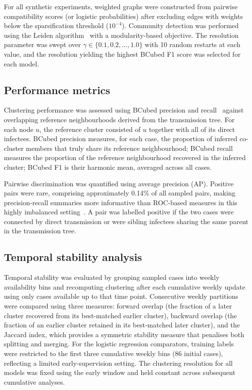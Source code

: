 \documentclass[10pt,letterpaper]{article}
\begin{document}
For all synthetic experiments, weighted graphs were constructed from pairwise compatibility scores (or logistic probabilities) after excluding edges with weights below the sparsification threshold ($10^{-4}$). Community detection was performed using the Leiden algorithm~\cite{Traag2019} with a modularity-based objective. The resolution parameter was swept over $\gamma \in \{0.1, 0.2, \ldots, 1.0\}$ with 10 random restarts at each value, and the resolution yielding the highest BCubed F1 score was selected for each model.

\subsection*{Performance metrics}

Clustering performance was assessed using BCubed precision and recall~\cite{Amigo2008} against overlapping reference neighbourhoods derived from the transmission tree. For each node $u$, the reference cluster consisted of $u$ together with all of its direct infectees. BCubed precision measures, for each case, the proportion of inferred co-cluster members that truly share its reference neighbourhood; BCubed recall measures the proportion of the reference neighbourhood recovered in the inferred cluster; BCubed F1 is their harmonic mean, averaged across all cases.

Pairwise discrimination was quantified using average precision (AP). Positive pairs were rare, comprising approximately 0.14\% of all sampled pairs, making precision-recall summaries more informative than ROC-based measures in this highly imbalanced setting~\cite{Saito2015}. A pair was labelled positive if the two cases were connected by direct transmission or were sibling infectees sharing the same parent in the transmission tree.

\subsection*{Temporal stability analysis}

Temporal stability was evaluated by grouping sampled cases into weekly availability bins and recomputing clustering after each cumulative weekly update using only cases available up to that time point. Consecutive weekly partitions were compared using three measures: forward overlap (the fraction of a later cluster recovered
from its best-matched earlier cluster), backward overlap (the fraction of an earlier cluster retained in its best-matched later cluster), and the Jaccard index, which provides a symmetric stability measure that penalises both splitting and merging. For the logistic regression comparators, training labels were restricted
to the first three cumulative weekly bins (86 initial cases), reflecting a limited early-supervision setting. The clustering resolution for all models was fixed using the early window and held constant across subsequent cumulative analyses.
\end{document}
